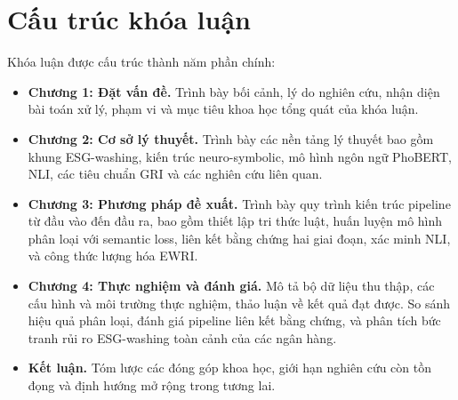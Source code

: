 \section{Cấu trúc khóa luận}
Khóa luận được cấu trúc thành năm phần chính:
\begin{itemize}
    \item \textbf{Chương 1: Đặt vấn đề.} Trình bày bối cảnh, lý do nghiên cứu, nhận diện bài toán xử lý, phạm vi và mục tiêu khoa học tổng quát của khóa luận.
    \item \textbf{Chương 2: Cơ sở lý thuyết.} Trình bày các nền tảng lý thuyết bao gồm khung ESG-washing, kiến trúc neuro-symbolic, mô hình ngôn ngữ PhoBERT, NLI, các tiêu chuẩn GRI và các nghiên cứu liên quan.
    \item \textbf{Chương 3: Phương pháp đề xuất.} Trình bày quy trình kiến trúc pipeline từ đầu vào đến đầu ra, bao gồm thiết lập tri thức luật, huấn luyện mô hình phân loại với semantic loss, liên kết bằng chứng hai giai đoạn, xác minh NLI, và công thức lượng hóa EWRI.
    \item \textbf{Chương 4: Thực nghiệm và đánh giá.} Mô tả bộ dữ liệu thu thập, các cấu hình và môi trường thực nghiệm, thảo luận về kết quả đạt được. So sánh hiệu quả phân loại, đánh giá pipeline liên kết bằng chứng, và phân tích bức tranh rủi ro ESG-washing toàn cảnh của các ngân hàng.
    \item \textbf{Kết luận.} Tóm lược các đóng góp khoa học, giới hạn nghiên cứu còn tồn đọng và định hướng mở rộng trong tương lai.
\end{itemize}





